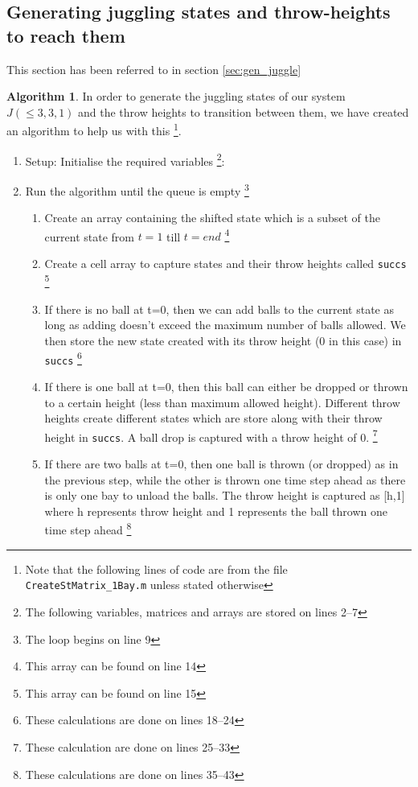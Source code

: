 \documentclass{article}
\theoremstyle{definition}
\newtheorem{algorithm}[theorem]{Algorithm}
\theoremstyle{remark}
\numberwithin{equation}{section}
\begin{document}
\subsection{Generating juggling states and throw-heights to reach them} \label{sec:genmat}

This section has been referred to in section \ref{sec:gen_juggle}

\begin{algorithm} In order to generate the juggling states of our system $J(\leq 3, 3, 1)$ and the throw heights to transition between them, we have created an algorithm to help us with this \footnote{Note that the following lines of code are from the file \lstinline|CreateStMatrix_1Bay.m| unless stated otherwise}.
    \begin{enumerate}
        \item Setup: Initialise the required variables \footnote{The following variables, matrices and arrays are stored on lines 2--7}: 
        \item Run the algorithm until the queue is empty \footnote{The loop begins on line 9 }
        \begin{enumerate}
            \item Create an array containing the shifted state which is a subset of the current state from $t=1$ till $t=end$ \footnote{This array can be found on line 14 }
            \item Create a cell array to capture states and their throw heights called \lstinline|succs| \footnote{This array can be found on line 15 }
            \item If there is no ball at t=0, then we can add balls to the current state as long as adding doesn't exceed the maximum number of balls allowed. We then store the new state created with its throw height (0 in this case) in \lstinline|succs| \footnote{These calculations are done on lines 18--24 }
            \item If there is one ball at t=0, then this ball can either be dropped or thrown to a certain height (less than maximum allowed height). Different throw heights create different states which are store along with their throw height in \lstinline|succs|. A ball drop is captured with a throw height of 0. \footnote{These calculation are done on lines 25--33 }
            \item If there are two balls at t=0, then one ball is thrown (or dropped) as in the previous step, while the other is thrown one time step ahead as there is only one bay to unload the balls. The throw height is captured as [h,1] where h represents throw height and 1 represents the ball thrown one time step ahead \footnote{These calculations are done on lines 35--43 }

\end{enumerate}
\end{enumerate}
\end{algorithm}
\end{document}
